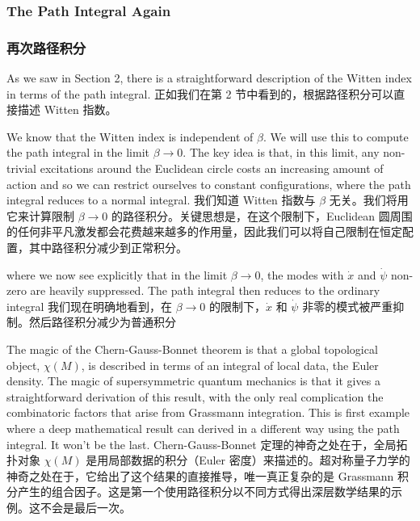 \documentclass{ctexart}
\begin{document}
\begin{paracol}{2}
\subsubsection{The Path Integral Again}
\switchcolumn
\subsubsection*{再次路径积分}
\switchcolumn*

As we saw in Section 2, there is a straightforward description of the Witten index in terms of the path integral.
\switchcolumn
正如我们在第 2 节中看到的，根据路径积分可以直接描述 Witten 指数。
\switchcolumn*

We know that the Witten index is independent of $\beta$. We will use this to compute the path integral in the limit $\beta \to 0$. The key idea is that, in this limit, any non-trivial excitations around the Euclidean circle costs an increasing amount of action and so we can restrict ourselves to constant configurations, where the path integral reduces to a normal integral.
\switchcolumn
我们知道 Witten 指数与 $\beta$ 无关。我们将用它来计算限制 $\beta \to 0$ 的路径积分。关键思想是，在这个限制下，Euclidean 圆周围的任何非平凡激发都会花费越来越多的作用量，因此我们可以将自己限制在恒定配置，其中路径积分减少到正常积分。
\switchcolumn*

where we now see explicitly that in the limit $\beta \to 0$, the modes with $\dot{x}$ and $\dot{\psi}$ non-zero are heavily suppressed. The path integral then reduces to the ordinary integral
\switchcolumn
我们现在明确地看到，在 $\beta \to 0$ 的限制下，$\dot{x}$ 和 $\dot{\psi}$ 非零的模式被严重抑制。然后路径积分减少为普通积分
\switchcolumn*

The magic of the Chern-Gauss-Bonnet theorem is that a global topological object, $\chi(M)$, is described in terms of an integral of local data, the Euler density. The magic of supersymmetric quantum mechanics is that it gives a straightforward derivation of this result, with the only real complication the combinatoric factors that arise from Grassmann integration. This is first example where a deep mathematical result can derived in a different way using the path integral. It won’t be the last.
\switchcolumn
Chern-Gauss-Bonnet 定理的神奇之处在于，全局拓扑对象 $\chi(M)$ 是用局部数据的积分（Euler 密度）来描述的。超对称量子力学的神奇之处在于，它给出了这个结果的直接推导，唯一真正复杂的是 Grassmann 积分产生的组合因子。这是第一个使用路径积分以不同方式得出深层数学结果的示例。这不会是最后一次。
\switchcolumn*


\end{paracol}
\end{document}
